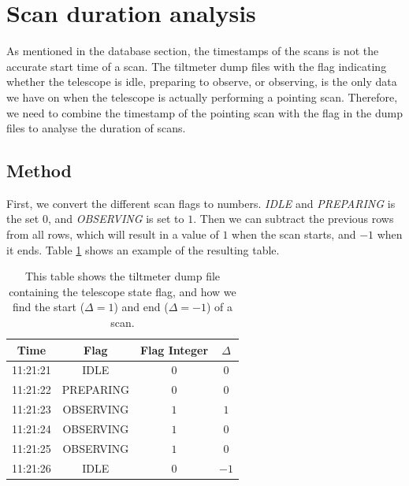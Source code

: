 
\section{Scan duration analysis}
As mentioned in the database section, the timestamps of the scans is not the accurate start time of a scan.
The tiltmeter dump files with the flag indicating whether the telescope is idle, preparing to observe, or observing,
is the only data we have on when the telescope is actually performing a pointing scan.
Therefore, we need to combine the timestamp of the pointing scan with the flag in the dump files to analyse the duration of scans.

\subsection{Method}
First, we convert the different scan flags to numbers.
\textit{IDLE} and \textit{PREPARING} is the set $0$, and \textit{OBSERVING} is set to $1$.
Then we can subtract the previous rows from all rows, which will result in a value of $1$ when the scan starts, and $-1$ when it ends.
Table \ref{tab:scan_flag_difference} shows an example of the resulting table.


\begin{table}[H]
    \centering
    \begin{tabular}{cccc}
        \toprule
        Time & Flag & Flag Integer & $\Delta$ \\
        \midrule
        11:21:21 & IDLE & $0$ & $0$ \\
        11:21:22 & PREPARING & $0$ & $0$ \\
        11:21:23 & OBSERVING & $1$ & $1$ \\
        11:21:24 & OBSERVING & $1$ & $0$ \\
        11:21:25 & OBSERVING & $1$ & $0$ \\
        11:21:26 & IDLE & $0$ & $-1$ \\
        \bottomrule
    \end{tabular}
    \caption{This table shows the tiltmeter dump file containing the telescope state flag,
            and how we find the start ($\Delta = 1$) and end ($\Delta = -1$) of a scan.}
    \label{tab:scan_flag_difference}
\end{table}

